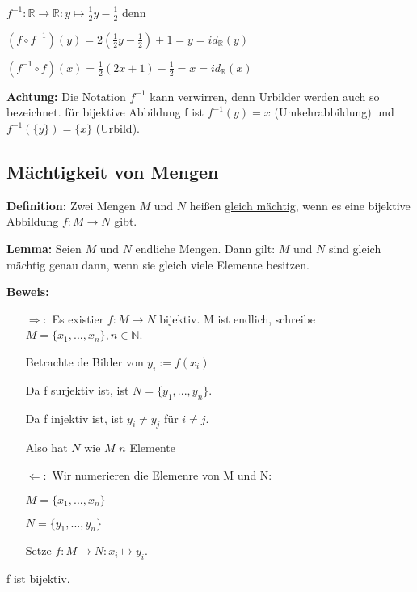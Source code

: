 \documentclass[pdftex,12pt,a4paper,fleqn]{scrartcl}
\begin{document}
$f^{-1}: \mathbb{R} \rightarrow \mathbb{R}: y \mapsto \frac{1}{2}y-\frac{1}{2}$ denn

$(f \circ f^{-1}) (y) = 2( \frac{1}{2}y -\frac{1}{2}) + 1 = y = id_\mathbb{R}(y)$

$(f^{-1} \circ f) (x) = \frac{1}{2}(2x+1)-\frac{1}{2} = x = id_\mathbb{R} (x)$

\textbf{Achtung:} Die Notation $f^{-1}$ kann verwirren, denn Urbilder werden auch so bezeichnet. für bijektive Abbildung f ist $f^{-1}(y)=x$ (Umkehrabbildung) und $f^{-1}(\{y\})=\{x\}$ (Urbild).

\newpage

\subsection{Mächtigkeit von Mengen} %
\label{sub:m_chtigkeit_von_mengen}

\textbf{Definition:} Zwei Mengen $M$ und $N$ heißen \underline{gleich mächtig}, wenn es eine bijektive Abbildung $f: M \rightarrow N$ gibt.

\textbf{Lemma:} Seien $M$ und $N$ endliche Mengen. Dann gilt: $M$ und $N$ sind gleich mächtig genau dann, wenn sie gleich viele Elemente besitzen.

\textbf{Beweis:} 
\begin{itemize}
    \item [$\Rightarrow:$] Es existier $f: M \rightarrow N$ bijektiv. M ist endlich, schreibe $M = \{x_1,...,x_n\}, n \in \mathbb{N}$. 

    Betrachte de Bilder von $y_i := f(x_i)$

    Da f surjektiv ist, ist $N = \{y_1,...,y_n\}$.

    Da f injektiv ist, ist $y_i \neq y_j$ für $i \neq j$.

    Also hat $N$ wie $M$ $n$ Elemente

    \item [$\Leftarrow:$] Wir numerieren die Elemenre von M und N:

    $M = \{x_1,...,x_n\}$

    $N = \{y_1,...,y_n\}$

    Setze $f: M \rightarrow N: x_i \mapsto y_i$. 
\end{itemize}

f ist bijektiv.




\end{document}
